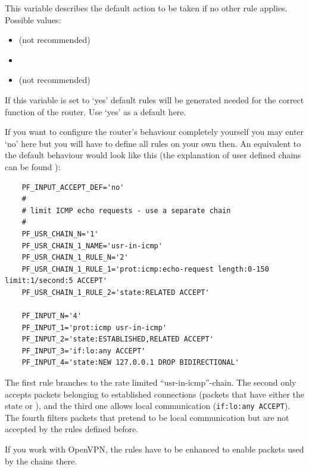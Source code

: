 \begin{description}
This variable describes the default action to be taken if no other
rule applies. Possible values:

\begin{itemize}
\item {} (not recommended)
\item {}
\item {} (not recommended)
\end{itemize}

If this variable is set to `yes' default rules will be generated needed for
the correct function of the router. Use `yes' as a default here.

If you want to configure the router's behaviour completely yourself you may
enter `no' here but you will have to define all rules on your own then.
An equivalent to the default behaviour would look like this (the explanation
of user defined chains can be found ):

\begin{example}
{\footnotesize
\begin{verbatim}
    PF_INPUT_ACCEPT_DEF='no'
    #
    # limit ICMP echo requests - use a separate chain
    #
    PF_USR_CHAIN_N='1'
    PF_USR_CHAIN_1_NAME='usr-in-icmp'
    PF_USR_CHAIN_1_RULE_N='2'
    PF_USR_CHAIN_1_RULE_1='prot:icmp:echo-request length:0-150 limit:1/second:5 ACCEPT'
    PF_USR_CHAIN_1_RULE_2='state:RELATED ACCEPT'

    PF_INPUT_N='4'
    PF_INPUT_1='prot:icmp usr-in-icmp'
    PF_INPUT_2='state:ESTABLISHED,RELATED ACCEPT'
    PF_INPUT_3='if:lo:any ACCEPT'
    PF_INPUT_4='state:NEW 127.0.0.1 DROP BIDIRECTIONAL'
\end{verbatim}}
\end{example}

The first rule branches to the rate limited ``usr-in-icmp''-chain.
The second only accepts packets belonging to established connections
(packets that have either the state  or
), and the third one allows local communication
(\verb+if:lo:any ACCEPT+). The fourth filters packets that pretend to
be local communication but are not accepted by the rules defined before.

If you work with OpenVPN, the rules have to be enhanced to enable packets used
by the chains there.


\end{description}
